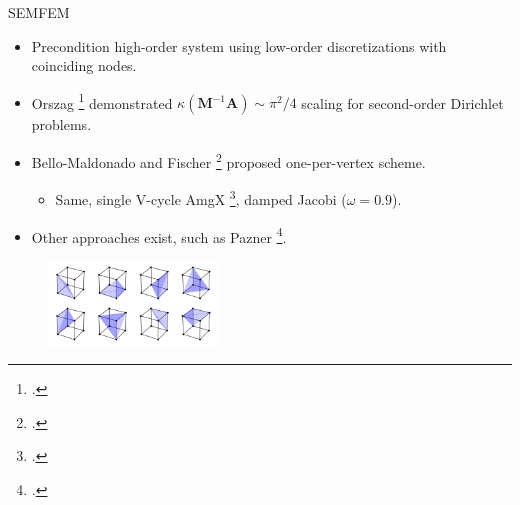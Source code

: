 \begin{frame}{SEMFEM}
  \begin{itemize}
    \item Precondition high-order system using low-order discretizations with coinciding nodes.
    \item Orszag \footcite{parter_spectral_1979} demonstrated $\kappa(\mathbf M^{-1} \mathbf A) \sim \pi^2/4$ scaling for second-order Dirichlet problems.
    \item Bello-Maldonado and Fischer \footcite{bello-maldonado_scalable_2019} proposed one-per-vertex scheme.
    \begin{itemize}
      \item{
        Same, single V-cycle AmgX \footcite{naumov_amgx_2015}, damped Jacobi ($\omega = 0.9$).
        }
    \end{itemize}
    \item Other approaches exist, such as Pazner \footcite{pazner2020efficient}.
  \end{itemize}
  \vspace{-0.35cm}
  \begin{figure}
    \includegraphics[width=0.4\textwidth]{../figs/one-tet-per-vertex.png}
  \end{figure}
\end{frame}
